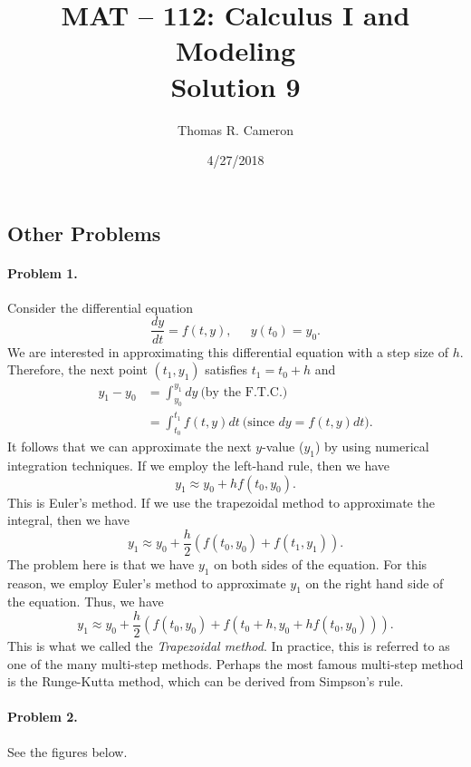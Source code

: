 \documentclass{article}
\title{MAT -- 112: Calculus I and Modeling\\
\large{Solution 9}}
\author{Thomas R. Cameron}
\date{4/27/2018}
\begin{document}
\maketitle

\subsection*{Other Problems}

\paragraph*{Problem 1.} Consider the differential equation
\[
\frac{dy}{dt}=f(t,y),~\quad~y(t_{0})=y_{0}.
\]
We are interested in approximating this differential equation with a step size of $h$. Therefore, the next point $(t_{1},y_{1})$ satisfies $t_{1}=t_{0}+h$ and
\begin{align*}
y_{1}-y_{0} &= \int_{y_{0}}^{y_{1}}dy~\text{(by the F.T.C.)} \\
&= \int_{t_{0}}^{t_{1}}f(t,y)dt~\text{(since $dy=f(t,y)dt$).}
\end{align*}
It follows that we can approximate the next $y$-value ($y_{1}$) by using numerical integration techniques. If we employ the left-hand rule, then we have
\[
y_{1}\approx y_{0}+hf(t_{0},y_{0}).
\]
This is Euler's method. If we use the trapezoidal method to approximate the integral, then we have
\[
y_{1}\approx y_{0}+\frac{h}{2}\left(f(t_{0},y_{0})+f(t_{1},y_{1})\right).
\]
The problem here is that we have $y_{1}$ on both sides of the equation. For this reason, we employ Euler's method to approximate $y_{1}$ on the right hand side of the equation. Thus, we have
\[
y_{1}\approx y_{0}+\frac{h}{2}\left(f(t_{0},y_{0})+f(t_{0}+h,y_{0}+hf(t_{0},y_{0}))\right).
\]
This is what we called the \emph{Trapezoidal method}. In practice,  this is referred to as one of the many multi-step methods. Perhaps the most famous multi-step method is the Runge-Kutta method, which can be derived from Simpson's rule. 

\newpage

\paragraph*{Problem 2.} See the figures below. 
\end{document}
